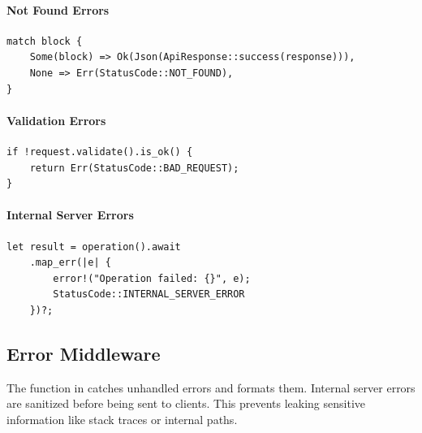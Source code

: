 \paragraph{Not Found Errors}

\begin{listing}[H]
\caption{Not found error pattern}
\label{lst:error-not-found}
\begin{verbatim}
match block {
    Some(block) => Ok(Json(ApiResponse::success(response))),
    None => Err(StatusCode::NOT_FOUND),
}
\end{verbatim}
\end{listing}

\needspace{3in}
\paragraph{Validation Errors}

\begin{listing}[H]
\caption{Validation error pattern}
\label{lst:error-validation}
\begin{verbatim}
if !request.validate().is_ok() {
    return Err(StatusCode::BAD_REQUEST);
}
\end{verbatim}
\end{listing}

\paragraph{Internal Server Errors}

\begin{listing}[H]
\caption{Internal server error pattern}
\label{lst:error-internal}
\begin{verbatim}
let result = operation().await
    .map_err(|e| {
        error!("Operation failed: {}", e);
        StatusCode::INTERNAL_SERVER_ERROR
    })?;
\end{verbatim}
\end{listing}

\subsection{Error Middleware}

The  function in  catches unhandled errors and formats them. Internal server errors are sanitized before being sent to clients. This prevents leaking sensitive information like stack traces or internal paths.

